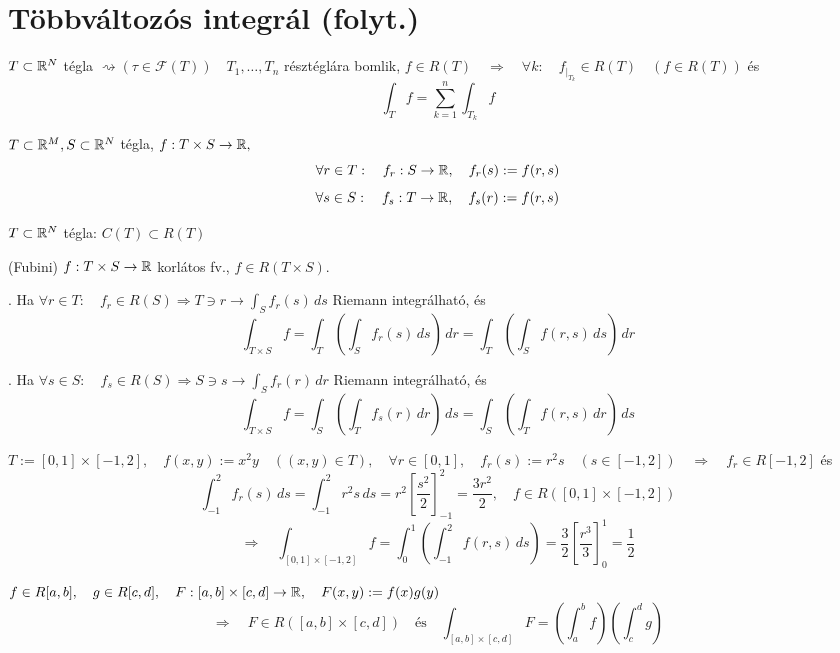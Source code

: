\documentclass[a4paper,11.5pt]{article}
\begin{document}
	\section{Többváltozós integrál (folyt.)}
	\begin{theorem}
		$T\subset \mathbb{R}^N$ tégla $\rightsquigarrow (\tau\in\mathcal{F}(T))\quad T_1,\ldots,T_n$ résztéglára bomlik, $f\in R(T)\quad \Rightarrow\quad \forall k:\quad f_{\big|_{T_k}}\in R(T)\quad (f\in R(T))$ és
		\[ \int_{T}f=\sum_{k=1}^n\int_{T_k}f \]
	\end{theorem}
	\begin{definition}
		$T\subset\mathbb{R}^M, S\subset\mathbb{R}^N$ tégla, $f:T\times S\to\mathbb{R},$
		\[ \forall r\in T:\quad f_r:S\to\mathbb{R},\quad f_r(s):=f(r,s) \]
		\[ \forall s\in S:\quad f_s:T\to\mathbb{R},\quad f_s(r):=f(r,s) \]
	\end{definition}
	\begin{theorem}
		$T\subset \mathbb{R}^N$ tégla: $C(T)\subset R(T)$
	\end{theorem}
	\begin{theorem}
		(Fubini) $f: T\times S\to\mathbb{R}$ korlátos fv., $f\in R(T\times S)$. 
		
		. Ha $\forall r\in T:\quad f_r\in R(S)\Rightarrow T\ni r\to\int_Sf_r(s)\,ds$ Riemann integrálható, és
		\[ \int_{T\times S}f=\int_T\left(\int_Sf_r(s)\,ds\right)\,dr=\int_T\left(\int_Sf(r,s)\,ds\right)\,dr \]
		
		. Ha $\forall s\in S:\quad f_s\in R(S)\Rightarrow S\ni s\to\int_Sf_r(r)\,dr$ Riemann integrálható, és
		\[ \int_{T\times S}f=\int_S\left(\int_Tf_s(r)\,dr\right)\,ds=\int_S\left(\int_Tf(r,s)\,dr\right)\,ds \]
		
	\end{theorem}
	\begin{example}
		$T:=[0,1]\times[-1,2],\quad f(x,y):=x^2y\quad ((x,y)\in T),\quad \forall r\in[0,1],\quad f_r(s):=r^2s\quad (s\in[-1,2])\quad \Rightarrow\quad f_r\in R[-1,2]$ és \[\int_{-1}^{2}f_r(s)\,ds=\int_{-1}^{2}r^2s\,ds=r^2\left[\frac{s^2}{2}\right]_{-1}^2=\frac{3r^2}{2}, \quad f\in R([0,1]\times[-1,2])\]
		\[ \Rightarrow\quad \int_{[0,1]\times[-1,2]}^{}f=\int_{0}^{1}\left(\int_{-1}^{2}f(r,s)\,ds\right)=\frac{3}{2}\left[\frac{r^3}{3}\right]^1_0=\frac{1}{2} \]
	\end{example}
	\begin{theorem}
		$f\in R[a,b],\quad g\in R[c,d],\quad F:[a,b]\times[c,d]\to\mathbb{R},\quad F(x,y):=f(x)g(y)$
		\[ \Rightarrow\quad F\in R([a,b]\times[c,d])\quad \text{és}\quad \int_{[a,b]\times[c,d]}^{}F=\left(\int_{a}^{b}f\right)\left(\int_{c}^{d}g\right) \]
	\end{theorem}
\end{document}
